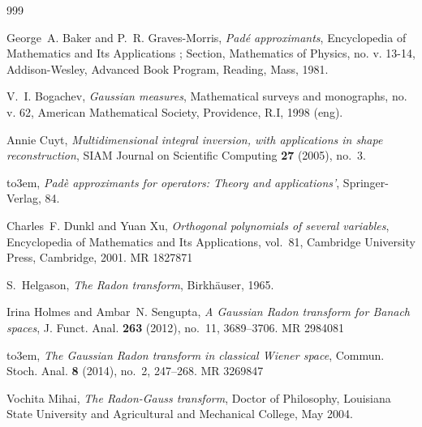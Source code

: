 \setcounter{page}{90}
\renewcommand{\thepage}{\arabic{page}}
\pagestyle{plain}



\providecommand{\bysame}{\leavevmode\hbox to3em{\hrulefill}\thinspace}
\providecommand{\MR}{\relax\ifhmode\unskip\space\fi MR }
\providecommand{\MRhref}[2]{%
  \href{http://www.ams.org/mathscinet-getitem?mr=#1}{#2}
}
\providecommand{\href}[2]{#2}
\begin{thebibliography}{999}



George~A. Baker and P.~R. {Graves-Morris}, \emph{Pad\'e approximants}, Encyclopedia of Mathematics and Its Applications ; {{Section}}, {{Mathematics}} of Physics, no. v. 13-14, Addison-Wesley, Advanced Book Program, Reading, Mass, 1981.

V.~I. Bogachev, \emph{Gaussian measures}, Mathematical surveys and monographs, no. v. 62, American Mathematical Society, Providence, R.I, 1998 (eng).

Annie Cuyt, \emph{Multidimensional integral inversion, with applications in shape reconstruction}, SIAM Journal on Scientific Computing \textbf{27} (2005), no.~3.

\bysame, \emph{{P}ad\`e approximants for operators: Theory and applications'}, Springer-Verlag, 84.

Charles~F. Dunkl and Yuan Xu, \emph{Orthogonal polynomials of several variables}, Encyclopedia of {{Mathematics}} and Its {{Applications}}, vol.~81, Cambridge University Press, Cambridge, 2001. \MR{1827871}

S.~Helgason, \emph{The {R}adon transform}, Birkh\"auser, 1965.

Irina Holmes and Ambar~N. Sengupta, \emph{A {G}aussian {R}adon transform for {B}anach spaces}, J. Funct. Anal. \textbf{263} (2012), no.~11, 3689--3706. \MR{2984081}

\bysame, \emph{The {G}aussian {R}adon transform in classical {W}iener space}, Commun. Stoch. Anal. \textbf{8} (2014), no.~2, 247--268. \MR{3269847}

Vochita Mihai, \emph{The {{Radon-Gauss}} transform}, Doctor of {{Philosophy}}, Louisiana State University and Agricultural and Mechanical College, May 2004.


\end{thebibliography}
